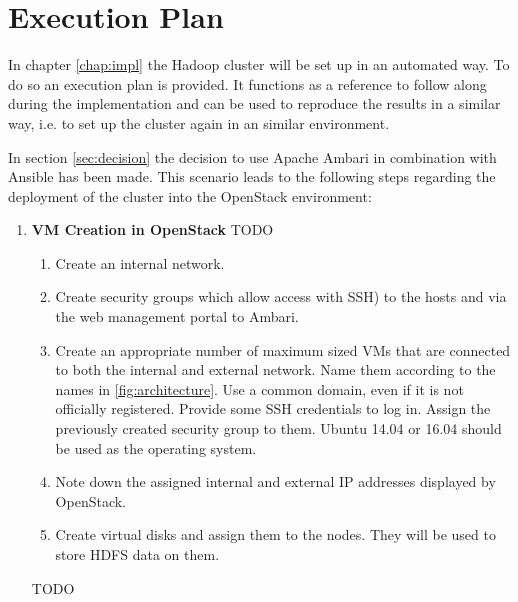 \section{Execution Plan}

In chapter \ref{chap:impl} the Hadoop cluster will be set up in an automated way.
To do so an execution plan is provided.
It functions as a reference to follow along during the implementation 
and can be used to reproduce the results in a similar way, i.e. to set up the cluster again in an similar environment.

In section \vref{sec:decision} the decision to use Apache Ambari in combination with Ansible has been made.
This scenario leads to the following steps regarding the deployment of the cluster into the OpenStack environment:

\begin{enumerate}
    \item \textbf{\ac{VM} Creation in OpenStack}
    TODO
    \begin{enumerate}
        \item Create an internal network.
        \item Create security groups which allow access with \ac{SSH}) to the hosts and via the web management portal to Ambari.
        \item Create an appropriate number of maximum sized \acp{VM} that are connected to both the internal and external network. Name them according to the names in \ref{fig:architecture}. Use a common domain, even if it is not officially registered. Provide some SSH credentials to log in.
        Assign the previously created security group to them.
        Ubuntu 14.04 or 16.04 should be used as the operating system.
        \item Note down the assigned internal and external \ac{IP} addresses displayed by OpenStack.
        \item Create virtual disks and assign them to the nodes. They will be used to store \ac{HDFS} data on them.
    \end{enumerate}
    TODO 


\end{enumerate}
